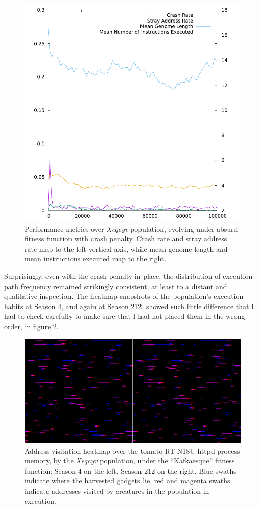 \documentclass[12pt,glossary]{dalthesis}
\begin{document}
\begin{figure}[htbp]
\centering
\includegraphics[width=.9\linewidth]{../images/plots/xeqcyv_kafka_performance.pdf}
\caption{\label{fig:org886b2a7}
Performance metrics over \emph{Xeqcyv} population, evolving under absurd fitness function with crash penalty. Crash rate and stray address rate map to the left vertical axis, while mean genome length and mean instructions executed map to the right.}
\end{figure}


Surprisingly, even with the crash penalty in place, the distribution of execution
path frequency remained strikingly consistent, at least to a distant and qualitative
inspection. The heatmap snapshots of the population's execution habits at Season 4,
and again at Season 212, showed such little difference that I had to check carefully
to make sure that I had not placed them in the wrong order, in figure
\ref{fig:orgb2c48b1}. 

\begin{figure}[htbp]
\centering
\includegraphics[width=.9\linewidth]{../images/plots/xeqcyv_kafka_heatmap_beginning_end.pdf}
\caption{\label{fig:orgb2c48b1}
Address-visitation heatmap over the tomato-RT-N18U-httpd process memory, by the \emph{Xeqcyv} population, under the ``Kafkaesque'' fitness function: Season 4 on the left, Season 212 on the right. Blue swaths indicate where the harvested gadgets lie, red and magenta swaths indicate addresses visited by creatures in the population in execution.}
\end{figure}
\end{document}
